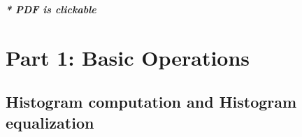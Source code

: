 \documentclass[a4paper,11pt]{article}%
\begin{document}

\tableofcontents

\begin{center}
	\textbf{\textit{* PDF is clickable}}
\end{center}

\pagebreak
\section{Part 1: Basic Operations}
\subsection{Histogram computation and Histogram equalization}
\begin{figure}[!h]
	\centering
\end{figure}
\end{document}

